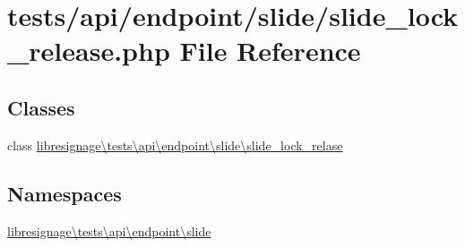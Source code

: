 \hypertarget{tests_2api_2endpoint_2slide_2slide__lock__release_8php}{}\section{tests/api/endpoint/slide/slide\+\_\+lock\+\_\+release.php File Reference}
\label{tests_2api_2endpoint_2slide_2slide__lock__release_8php}
\subsection*{Classes}
\begin{DoxyCompactItemize}
\item 
class \hyperlink{classlibresignage_1_1tests_1_1api_1_1endpoint_1_1slide_1_1slide__lock__relase}{libresignage\textbackslash{}tests\textbackslash{}api\textbackslash{}endpoint\textbackslash{}slide\textbackslash{}slide\+\_\+lock\+\_\+relase}
\end{DoxyCompactItemize}
\subsection*{Namespaces}
\begin{DoxyCompactItemize}
\item 
 \hyperlink{namespacelibresignage_1_1tests_1_1api_1_1endpoint_1_1slide}{libresignage\textbackslash{}tests\textbackslash{}api\textbackslash{}endpoint\textbackslash{}slide}
\end{DoxyCompactItemize}
